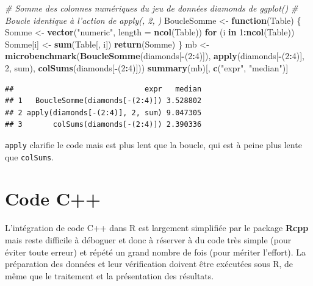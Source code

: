 \documentclass[
  12pt,
  french,
  a4paper,
  extrafontsizes,onecolumn,openright
  ]{memoir}
\newenvironment{Shaded}{\begin{snugshade}}{\end{snugshade}}
\newcommand{\CommentTok}[1]{\textcolor[rgb]{0.56,0.35,0.01}{\textit{#1}}}
\newcommand{\ControlFlowTok}[1]{\textcolor[rgb]{0.13,0.29,0.53}{\textbf{#1}}}
\newcommand{\DataTypeTok}[1]{\textcolor[rgb]{0.13,0.29,0.53}{#1}}
\newcommand{\DecValTok}[1]{\textcolor[rgb]{0.00,0.00,0.81}{#1}}
\newcommand{\KeywordTok}[1]{\textcolor[rgb]{0.13,0.29,0.53}{\textbf{#1}}}
\newcommand{\NormalTok}[1]{#1}
\newcommand{\OperatorTok}[1]{\textcolor[rgb]{0.81,0.36,0.00}{\textbf{#1}}}
\newcommand{\StringTok}[1]{\textcolor[rgb]{0.31,0.60,0.02}{#1}}
\begin{document}
\begin{Shaded}
\begin{Highlighting}[]
\CommentTok{# Somme des colonnes numériques du jeu de données diamonds de ggplot()}
\CommentTok{# Boucle identique à l'action de apply(, 2, )}
\NormalTok{BoucleSomme <-}\StringTok{ }\ControlFlowTok{function}\NormalTok{(Table) \{}
\NormalTok{  Somme <-}\StringTok{ }\KeywordTok{vector}\NormalTok{(}\StringTok{"numeric"}\NormalTok{, }\DataTypeTok{length =} \KeywordTok{ncol}\NormalTok{(Table))}
  \ControlFlowTok{for}\NormalTok{ (i }\ControlFlowTok{in} \DecValTok{1}\OperatorTok{:}\KeywordTok{ncol}\NormalTok{(Table)) Somme[i] <-}\StringTok{ }\KeywordTok{sum}\NormalTok{(Table[, i])}
  \KeywordTok{return}\NormalTok{(Somme)}
\NormalTok{\}}
\NormalTok{mb <-}\StringTok{ }\KeywordTok{microbenchmark}\NormalTok{(}\KeywordTok{BoucleSomme}\NormalTok{(diamonds[}\OperatorTok{-}\NormalTok{(}\DecValTok{2}\OperatorTok{:}\DecValTok{4}\NormalTok{)]), }
                     \KeywordTok{apply}\NormalTok{(diamonds[}\OperatorTok{-}\NormalTok{(}\DecValTok{2}\OperatorTok{:}\DecValTok{4}\NormalTok{)], }\DecValTok{2}\NormalTok{, sum), }
                     \KeywordTok{colSums}\NormalTok{(diamonds[}\OperatorTok{-}\NormalTok{(}\DecValTok{2}\OperatorTok{:}\DecValTok{4}\NormalTok{)]))}
\KeywordTok{summary}\NormalTok{(mb)[, }\KeywordTok{c}\NormalTok{(}\StringTok{"expr"}\NormalTok{, }\StringTok{"median"}\NormalTok{)]}
\end{Highlighting}
\end{Shaded}

\begin{verbatim}
##                              expr   median
## 1   BoucleSomme(diamonds[-(2:4)]) 3.528802
## 2 apply(diamonds[-(2:4)], 2, sum) 9.047305
## 3       colSums(diamonds[-(2:4)]) 2.390336
\end{verbatim}

\normalsize

\texttt{apply} clarifie le code mais est plus lent que la boucle, qui est à peine plus lente que \texttt{colSums}.

\hypertarget{sec:cpp}{%
\section{Code C++}\label{sec:cpp}}

L'intégration de code C++ dans R est largement simplifiée par le package \textbf{Rcpp} mais reste difficile à déboguer et donc à réserver à du code très simple (pour éviter toute erreur) et répété un grand nombre de fois (pour mériter l'effort).
La préparation des données et leur vérification doivent être exécutées sous R, de même que le traitement et la présentation des résultats.
\end{document}
